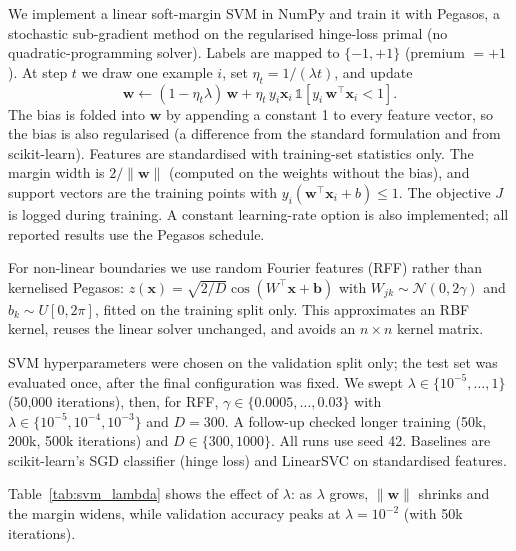 We implement a linear soft-margin SVM in NumPy and train it with Pegasos,
a stochastic sub-gradient method on the regularised hinge-loss primal
(no quadratic-programming solver). Labels are mapped to $\{-1,+1\}$
(premium $=+1$). At step $t$ we draw one example $i$, set
$\eta_t = 1/(\lambda t)$, and update
\begin{equation}
  \mathbf{w} \leftarrow (1-\eta_t\lambda)\,\mathbf{w}
  + \eta_t\, y_i \mathbf{x}_i \,\mathbb{1}\!\left[y_i\,\mathbf{w}^{\top}\mathbf{x}_i < 1\right].
\end{equation}
The bias is folded into $\mathbf{w}$ by appending a constant 1 to every
feature vector, so the bias is also regularised (a difference from the
standard formulation and from scikit-learn). Features are standardised
with training-set statistics only. The margin width is $2/\lVert\mathbf{w}\rVert$
(computed on the weights without the bias), and support vectors are the
training points with $y_i(\mathbf{w}^{\top}\mathbf{x}_i+b)\le 1$. The
objective $J$ is logged during training. A constant learning-rate option
is also implemented; all reported results use the Pegasos schedule.

For non-linear boundaries we use random Fourier features (RFF) rather than
kernelised Pegasos: $z(\mathbf{x})=\sqrt{2/D}\cos(W^{\top}\mathbf{x}+\mathbf{b})$
with $W_{jk}\sim\mathcal{N}(0,2\gamma)$ and $b_k\sim U[0,2\pi]$, fitted on
the training split only. This approximates an RBF kernel, reuses the linear
solver unchanged, and avoids an $n\times n$ kernel matrix.

SVM hyperparameters were chosen on the validation split only; the test set
was evaluated once, after the final configuration was fixed. We swept
$\lambda\in\{10^{-5},\dots,1\}$ (50{,}000 iterations), then, for RFF,
$\gamma\in\{0.0005,\dots,0.03\}$ with $\lambda\in\{10^{-5},10^{-4},10^{-3}\}$
and $D=300$. A follow-up checked longer training (50k, 200k, 500k iterations)
and $D\in\{300,1000\}$. All runs use seed 42. Baselines are scikit-learn's
SGD classifier (hinge loss) and LinearSVC on standardised features.

Table~\ref{tab:svm_lambda} shows the effect of $\lambda$: as $\lambda$ grows,
$\lVert\mathbf{w}\rVert$ shrinks and the margin widens, while validation
accuracy peaks at $\lambda=10^{-2}$ (with 50k iterations).

